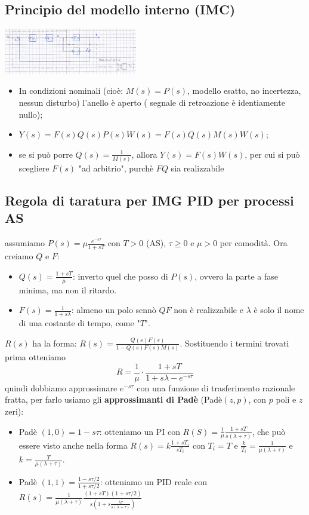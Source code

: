 \begin{landscape}
\begin{multicols*}{2}
    \subsection{Principio del modello interno (IMC)}
    \begin{center}
        \includegraphics[height=2cm]{../formulario/img6.JPG}
    \end{center}
    \begin{itemize}
        \item In condizioni nominali (cioè: $M(s) = P(s)$, modello esatto, no incertezza, nessun disturbo) l'anello è aperto ( segnale di retroazione è identiamente nullo);
        \item $Y(s) = F(s)Q(s)P(s)W(s) = F(s) Q(s)M(s)W(s)$;
        \item se si può porre $Q(s) = \frac{1}{M(s)}$, allora $Y(s) = F(s) W(s)$, per cui si può scegliere $F(s)$ "ad arbitrio", purchè $FQ$ sia realizzabile
    \end{itemize}
    \subsection{Regola di taratura per IMG PID per processi AS}
    assumiamo $P(s) = \mu \frac{e^{-s \tau}}{1+s T}$ con $T> 0$ (AS), $\tau \geq 0$ e $\mu > 0$ per comodità.\newline
    \newline
    Ora creiamo $Q$ e $F$:
    \begin{itemize}
        \item $Q(s) = \frac{1 + s T}{\mu}$: inverto quel che posso di $P(s)$, ovvero la parte a fase minima, ma non il ritardo.
        \item $F(s) = \frac{1}{1+s \lambda}$: almeno un polo sennò $QF$ non è realizzabile e $\lambda$ è solo il nome di una costante di tempo, come "$T$".
    \end{itemize}
    $R(s)$ ha la forma: $R(s)= \frac{Q(s) F(s)}{1- Q(s)F(s)M(s)}$. Sostituendo i termini trovati prima otteniamo
    \[
        R = \frac{1}{\mu} \cdot \frac{1+sT}{1+s \lambda - e^{-s \tau}}
    \]
    quindi dobbiamo approssimare $e^{-s \tau}$ con una funzione di trasferimento razionale fratta, per farlo usiamo gli \textbf{approssimanti di Padè} (Padè$(z,p)$, con $p$ poli e $z$ zeri):
    \begin{itemize}
        \item Padè $(1,0) = 1- s \tau$: otteniamo un PI con $R(S) = \frac{1}{\mu} \frac{1+sT}{s(\lambda + \tau)}$, che può essere visto anche nella forma $R(s) = k \frac{1+ s T_i}{sT_i}$ con $T_i = T$ e $\frac{k}{T_i} = \frac{1}{\mu(\lambda+\tau)}$ e $k = \frac{T}{\mu(\lambda + \tau)}$.
        \item Padè $(1,1) = \frac{1-s \tau/2}{1 + s \tau/2}$: otteniamo un PID reale con $R(s) = \frac{1}{\mu (\lambda + \tau)} \frac{(1+sT) (1+s \tau/2)}{s (1+ s \frac{\lambda \tau}{s (\lambda + \tau)})}$
    \end{itemize}

\end{multicols*}
\end{landscape}
